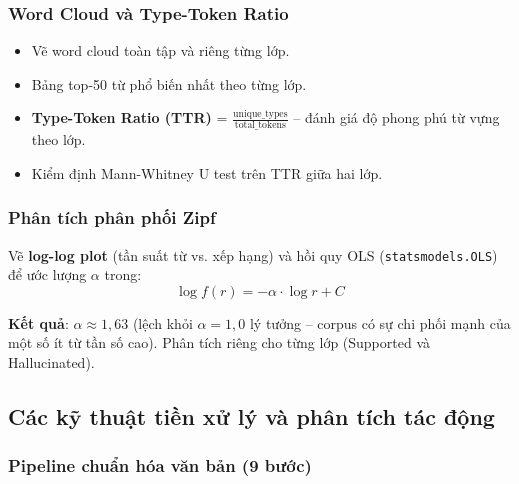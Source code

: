 \documentclass[12pt,a4paper]{article}
\let\oldtextbf\textbf
\renewcommand{\textbf}[1]{\oldtextbf{\textcolor{hcmublue}{#1}}}
\begin{document}
\subsubsection{Word Cloud và Type-Token Ratio}

\begin{itemize}
    \item Vẽ word cloud toàn tập và riêng từng lớp.
    \item Bảng top-50 từ phổ biến nhất theo từng lớp.
    \item \textbf{Type-Token Ratio (TTR)} = $\frac{\text{unique\_types}}{\text{total\_tokens}}$ -- đánh giá độ phong phú từ vựng theo lớp.
    \item Kiểm định Mann-Whitney U test trên TTR giữa hai lớp.
\end{itemize}

\subsubsection{Phân tích phân phối Zipf}

Vẽ \textbf{log-log plot} (tần suất từ vs. xếp hạng) và hồi quy OLS (\texttt{statsmodels.OLS}) để ước lượng $\alpha$ trong:
\[
\log f(r) = -\alpha \cdot \log r + C
\]

\textbf{Kết quả}: $\alpha \approx 1{,}63$ (lệch khỏi $\alpha = 1{,}0$ lý tưởng -- corpus có sự chi phối mạnh của một số ít từ tần số cao). Phân tích riêng cho từng lớp (Supported và Hallucinated).

\subsection{Các kỹ thuật tiền xử lý và phân tích tác động}

\subsubsection{Pipeline chuẩn hóa văn bản (9 bước)}
\end{document}
